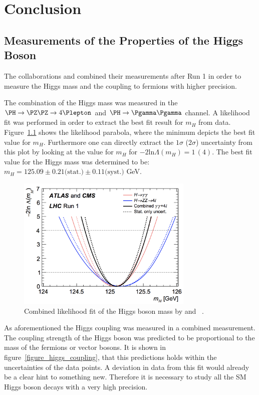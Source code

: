 \chapter{Conclusion \label{chapter4_conclusion}}


\section{Measurements of the Properties of the Higgs Boson}

The collaborations \CMS and \ATLAS combined their measurements after Run 1 in order to measure the Higgs mass and
the coupling to fermions with higher precision.

The combination of the Higgs mass was measured in the $\PH \rightarrow \PZ \PZ \rightarrow 4\Plepton$ and
$\PH \rightarrow \Pgamma \Pgamma$ channel. A likelihood fit was performed in order to extract the best fit result for
$m_H$ from data. Figure~\ref{figure_higgs_mass} shows the likelihood parabola, where the minimum depicts the best fit value for $m_H$. Furthermore
one can directly extract the $1\sigma$ ($2\sigma$) uncertainty from this plot by looking at the value for $m_H$ for $-2\mathrm{ln} \Lambda(m_H)=1 \,(4)$.
The best fit value for the Higgs mass was determined to be:
$m_H=125.09 \pm 0.21 \text{(stat.)} \pm 0.11 \text{(syst.)}$ GeV.

\begin{figure}[h]
\includegraphics[width=0.75\textwidth]{../plots/higgsmass}
\caption[Higgs boson mass.]{Combined likelihood fit of the Higgs boson mass by \ATLAS and \CMS~\cite{HiggsMass}.}
\label{figure_higgs_mass}
\end{figure}

As aforementioned the Higgs coupling was measured in a combined measurement. The coupling strength of the Higgs boson was predicted
to be proportional to the mass of the fermions or vector bosons. It is shown in figure~\ref{figure_higgs_coupling}, that this predictions holds
within the uncertainties of the data points. A deviation in data from this fit would already be a clear hint to something new. Therefore it is necessary to study
all the SM Higgs boson decays with a very high precision.

